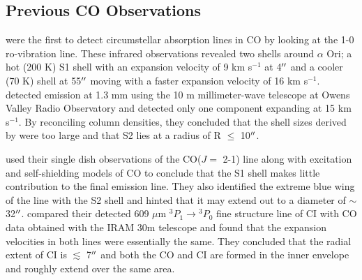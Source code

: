 \documentclass[preprint2]{aastex}
\begin{document}
\subsection{Previous CO Observations}
\cite{1979ApJ...233L.135B} were the first to detect circumstellar absorption lines in CO by looking at the 1-0 ro-vibration line. These infrared observations revealed two shells around $\alpha$ Ori; a hot (200 K) S1 shell with an expansion velocity of 9 km s${}^{-1}$ at 4$\mbox{$^{\prime\prime}$}$ and a cooler (70 K) shell at 55$\mbox{$^{\prime\prime}$}$ moving with a faster expansion velocity of 16 km s${}^{-1}$. \cite{1980ApJ...242L..25K} detected emission at 1.3 mm using the 10 m millimeter-wave telescope at Owens Valley Radio Observatory and detected only one component expanding at 15 km s${}^{-1}$. By reconciling column densities, they concluded that the shell sizes derived by \cite{1979ApJ...233L.135B} were too large and that S2 lies at a radius of R $\leq$ 10$\mbox{$^{\prime\prime}$}$.

\cite{1987ApJ...313..400H} used their single dish observations of the CO($J=$ 2-1) line along with excitation and self-shielding models of CO to conclude that the S1 shell makes little contribution to the final emission line. They also identified the extreme blue wing of the line with the S2 shell and hinted that it may extend out to a diameter of $\sim$ 32$\mbox{$^{\prime\prime}$}$. \cite{1994ApJ...424L.127H} compared their detected 609 $\mu$m ${}^3P{}_1\rightarrow{}^3P{}_0$ fine structure line of CI with CO data obtained with the IRAM 30m telescope and found that the expansion velocities in both lines were essentially the same. They concluded that the radial extent of CI is $\lesssim$ 7$\mbox{$^{\prime\prime}$}$ and both the CO and CI are formed in the inner envelope and roughly extend over the same area. 
\end{document}
